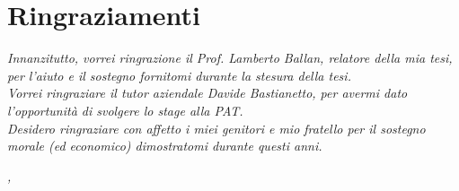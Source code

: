 
\cleardoublepage
{}
{}

\bigskip

\begingroup
\let\clearpage\relax
\let\cleardoublepage\relax
\let\cleardoublepage\relax

\chapter*{Ringraziamenti}

\noindent \textit{Innanzitutto, vorrei ringrazione il Prof. Lamberto Ballan, relatore della mia tesi, per l'aiuto e il sostegno fornitomi durante la stesura della tesi.}\\
\noindent \textit{Vorrei ringraziare il tutor aziendale Davide Bastianetto, per avermi dato l'opportunità di svolgere lo stage alla PAT.}\\
\noindent \textit{Desidero ringraziare con affetto i miei genitori e mio fratello per il sostegno morale (ed economico) dimostratomi durante questi anni.}\\

\bigskip

\noindent\textit{\myLocation, \myTime}
\hfill \myName

\endgroup

